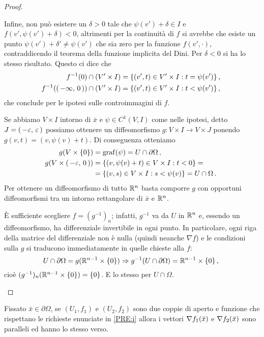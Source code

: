 \begin{proof}
\begin{description}
			Infine, non può esistere un $\delta>0$ tale che $\psi(v')+\delta\in I$ e
			$f(v',\psi(v')+\delta)<0$, altrimenti per la continuità di $f$ si avrebbe che esiste un punto $\psi(v')+\delta'\neq \psi(v')$
			che sia zero per la funzione $f(v',\cdot)$, contraddicendo il teorema della funzione implicita del Dini.
			Per $\delta<0$ si ha lo stesso risultato. Questo ci dice che 
			\begin{align*}
				f^{-1}(0)\cap (V'\times I)&=\{(v',t)\in V'\times I:t=\psi(v')\} \, \text{, }\\
				f^{-1}(\left(\,-\infty,\,0\,\right))\cap (V'\times I)&=\{(v',t)\in V'\times I:t<\psi(v')\}\, \text{, }
			\end{align*}
			che conclude per le ipotesi sulle controimmagini di $f$.
		\item [\ImplicationProof{PRE:iii}{PRE:ii}] Se abbiamo $V\times I$ intorno di $\bar x$ e $\psi\in C^1(V,I)$ come nelle ipotesi, detto $J=\left(\,-\varepsilon,\,\varepsilon\,\right)$
			possiamo ottenere un diffeomorfismo $g:V\times I \rightarrow V\times J$ ponendo $g(v,t)=(v,\psi(v)+t)$. 
			Di conseguenza otteniamo
			\begin{align*}
				g(V\times \{0\})&=\operatorname{graf}(\psi)=U\cap \partial \Omega \, \text{, }\\
				g(V\times \left(\,-\varepsilon,\,0\,\right))&=\{(v,\psi(v)+t)\in V\times I:t<0\}=\\
												&=\{(v,s)\in V\times I:s<\psi(v)\}=U\cap \Omega\, \text{. }
			\end{align*}
			Per ottenere un diffeomorfismo di tutto $\mathbb R^n$ basta comporre $g$ con opportuni diffeomorfismi tra un intorno rettangolare
			di $\bar x$ e $\mathbb R^n$.
		\item [\ImplicationProof{PRE:ii}{PRE:i}] È sufficiente scegliere $f=(g^{-1})_n$; infatti, $g^{-1}$ va da $U$ in $\mathbb R^n$ e, essendo un diffeomorfismo, ha differenziale invertibile in ogni punto.
			In particolare, ogni riga della matrice del differenziale non è nulla (quindi neanche $\nabla f$) e le condizioni sulla $g$ si traducono immediatamente in quelle chieste alla $f$:
			\[
				U\cap \partial \Omega = g(\mathbb R^{n-1}\times\{0\}) \Rightarrow g^{-1}(U\cap \partial \Omega) = \mathbb R^{n-1}\times\{0\}\, \text{, }
			\]
			cioè $(g^{-1})_n(\mathbb R^{n-1}\times\{0\}) = \{0\}$. E lo stesso per $U\cap\Omega$.
	\end{description}
\end{proof}
\begin{lemma}\label{lemma:BuonaDefinizioneNormale}
	Fissato $\bar x\in\partial\Omega$, se $(U_1,f_1)$ e $(U_2,f_2)$ sono due coppie di aperto e funzione che rispettano le richieste enunciate in \ref{PRE:i} allora i vettori $\nabla f_1(\bar x)$ e $\nabla f_2(\bar x)$ sono paralleli ed hanno lo stesso verso.
\end{lemma}

